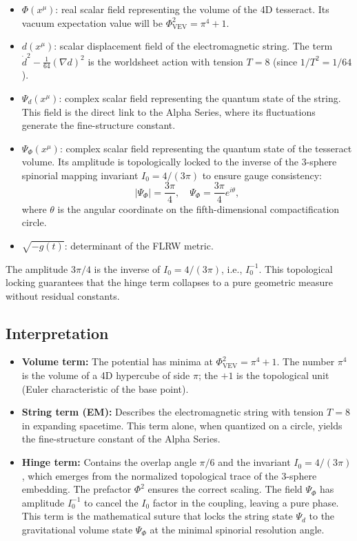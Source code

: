 \documentclass[12pt]{article}
\begin{document}
\begin{itemize}
    \item \(\Phi(x^\mu)\): real scalar field representing the volume of the 4D tesseract. Its vacuum expectation value will be \(\Phi_{\text{VEV}}^2 = \pi^4 + 1\).
    \item \(d(x^\mu)\): scalar displacement field of the electromagnetic string. The term \(\dot{d}^2 - \frac{1}{64}(\nabla d)^2\) is the worldsheet action with tension \(T=8\) (since \(1/T^2 = 1/64\)).
    \item \(\Psi_d(x^\mu)\): complex scalar field representing the quantum state of the string. This field is the direct link to the Alpha Series, where its fluctuations generate the fine-structure constant.
    \item \(\Psi_\Phi(x^\mu)\): complex scalar field representing the quantum state of the tesseract volume. Its amplitude is topologically locked to the inverse of the 3-sphere spinorial mapping invariant \(I_0 = 4/(3\pi)\) to ensure gauge consistency:
    \[
    |\Psi_\Phi| = \frac{3\pi}{4}, \quad \Psi_\Phi = \frac{3\pi}{4} e^{i\theta},
    \]
    where \(\theta\) is the angular coordinate on the fifth-dimensional compactification circle.
    \item \(\sqrt{-g(t)}\): determinant of the FLRW metric.
\end{itemize}

The amplitude \(3\pi/4\) is the inverse of \(I_0 = 4/(3\pi)\), i.e., \(I_0^{-1}\). This topological locking guarantees that the hinge term collapses to a pure geometric measure without residual constants.

\subsection{Interpretation}

\begin{itemize}
    \item \textbf{Volume term:} The potential has minima at \(\Phi_{\text{VEV}}^2 = \pi^4 + 1\). The number \(\pi^4\) is the volume of a 4D hypercube of side \(\pi\); the \(+1\) is the topological unit (Euler characteristic of the base point).
    \item \textbf{String term (EM):} Describes the electromagnetic string with tension \(T=8\) \cite{Polyakov1987} in expanding spacetime. This term alone, when quantized on a circle, yields the fine-structure constant of the Alpha Series.
    \item \textbf{Hinge term:} Contains the overlap angle \(\pi/6\) and the invariant \(I_0 = 4/(3\pi)\), which emerges from the normalized topological trace of the 3-sphere embedding. The prefactor \(\Phi^2\) ensures the correct scaling. The field \(\Psi_\Phi\) has amplitude \(I_0^{-1}\) to cancel the \(I_0\) factor in the coupling, leaving a pure phase. This term is the mathematical suture that locks the string state \(\Psi_d\) to the gravitational volume state \(\Psi_\Phi\) at the minimal spinorial resolution angle.
\end{itemize}
\end{document}
